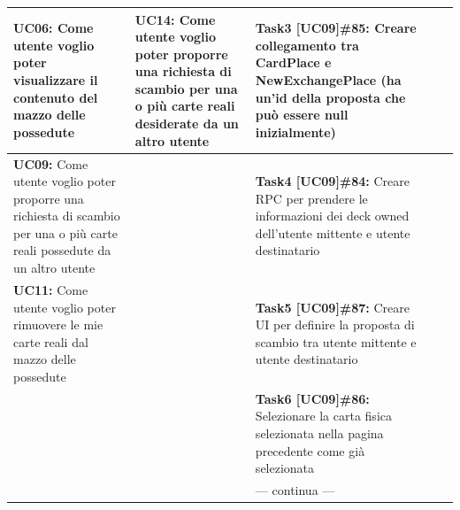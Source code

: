 \documentclass[a4paper, oneside]{article}
\begin{document}
\begin{landscape}
\begin{tabular}{ | p{4.5cm} | p{5.5cm} | p{5.2cm} | p{5.8cm} | p{2cm}| }
            \hline
            \textbf{UC06:} Come utente voglio poter visualizzare il contenuto del mazzo delle possedute & \textbf{UC14:} Come utente voglio poter proporre una richiesta di scambio per una o più carte reali desiderate da un altro utente  & \textbf{Task3 [UC09]\#85:} Creare collegamento tra CardPlace e NewExchangePlace (ha un'id della proposta che può essere null inizialmente) & & \\
            \hline
            \textbf{UC09:} Come utente voglio poter proporre una richiesta di scambio per una o più carte reali possedute da un altro utente &  & \textbf{Task4 [UC09]\#84:} Creare RPC per prendere le informazioni dei deck owned dell'utente mittente e utente destinatario & & \\
            \hline
            \textbf{UC11:} Come utente voglio poter rimuovere le mie carte reali dal mazzo delle possedute & & \textbf{Task5 [UC09]\#87:} Creare UI per definire la proposta di scambio tra utente mittente e utente destinatario & & \\
            \hline
            & & \textbf{Task6 [UC09]\#86:} Selezionare la carta fisica selezionata nella pagina precedente come già selezionata & & \\
            \hline
            & & --- continua --- & & \\
            \hline
        \end{tabular}

        \newpage

\end{landscape}
\end{document}
